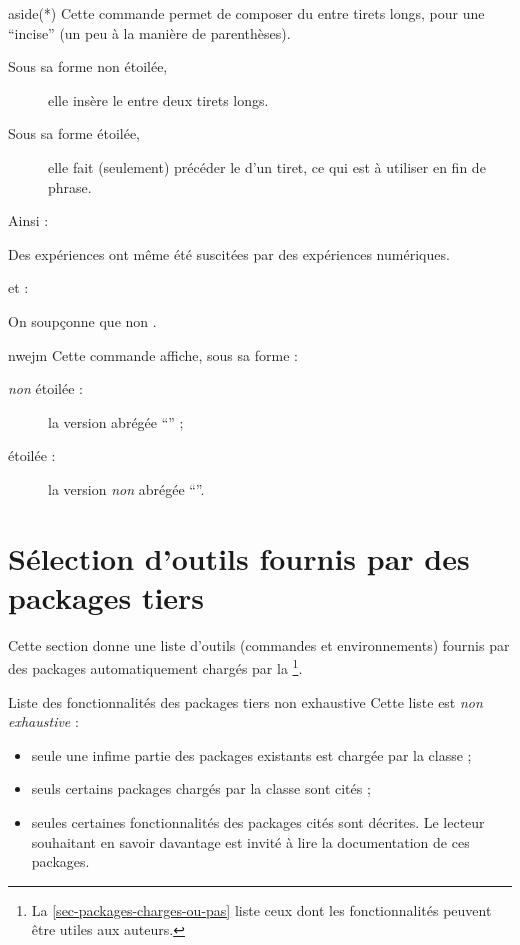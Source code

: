 \documentclass[french,nolocaltoc]{nwejmart}
\newtheorem[title=Fait,style=definition]{fact}
\begin{document}
\begin{docCommand}{aside(*)}{}
  Cette commande permet de composer du  entre tirets longs, pour une
  \enquote{incise} (un peu à la manière de parenthèses).
  \begin{description}
  \item[Sous sa forme non étoilée,] elle insère le  entre deux
    tirets longs.
  \item[Sous sa forme étoilée,] elle fait (seulement) précéder le 
    d'un tiret, ce qui est à utiliser en fin de phrase.
  \end{description}
  Ainsi :
\begin{bodycode}
Des expériences  ont même été
suscitées par des expériences numériques.
\end{bodycode}
  et :
\begin{bodycode}[listing and text,listing options={deletekeywords={exemple}}]
On soupçonne que non .
\end{bodycode}
\end{docCommand}

\begin{docCommand}{nwejm}{}
  Cette commande affiche, sous sa forme :
  \begin{description}
  \item[\emph{non} étoilée :] la version abrégée \enquote{\nwejm{}} ;
  \item[étoilée :] la version \emph{non} abrégée \enquote{\nwejm*{}}.
  \end{description}
\end{docCommand}

\section{Sélection d'outils fournis par des packages tiers}

Cette section donne une liste d'outils (commandes et environnements) fournis par
des packages automatiquement chargés par la \nwejmauthorcl\footnote{La
  \vref{sec-packages-charges-ou-pas} liste ceux dont les fonctionnalités peuvent
  être utiles aux auteurs.}.

\begin{dbwarning}{Liste des fonctionnalités des packages tiers non exhaustive}{}
  Cette liste est \emph{non exhaustive} :
  \begin{itemize}
  \item seule une infime partie des packages existants est chargée par la
    classe ;
  \item seuls certains packages chargés par la classe sont cités ;
  \item seules certaines fonctionnalités des packages cités sont décrites. Le
    lecteur souhaitant en savoir davantage est invité à lire la documentation de
    ces packages.
  \end{itemize}
\end{dbwarning}
\end{document}

